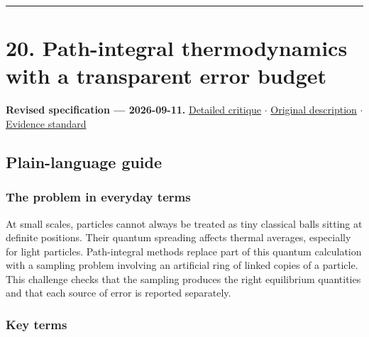 \documentclass[
  11pt,
]{article}
\begin{document}
\begin{center}\rule{0.5\linewidth}{0.5pt}\end{center}

\section{20. Path-integral thermodynamics with a transparent error
budget}

\textbf{Revised specification --- 2026-09-11.}
\href{https://github.com/rick-stevens-ai/Pure-Thought/blob/main/reviews/20-Ab-Initio-Path-Integrals.md}{Detailed
critique} \ensuremath{\cdot}
\href{https://github.com/rick-stevens-ai/Pure-Thought/blob/main/archive/original-PRDs/20-Ab-Initio-Path-Integrals.md}{Original
description} \ensuremath{\cdot}
\href{https://github.com/rick-stevens-ai/Pure-Thought/blob/main/reviews/EVIDENCE-STANDARD.md}{Evidence
standard}

\subsection{Plain-language guide}

\subsubsection{The problem in everyday terms}

At small scales, particles cannot always be treated as tiny classical
balls sitting at definite positions. Their quantum spreading affects
thermal averages, especially for light particles. Path-integral methods
replace part of this quantum calculation with a sampling problem
involving an artificial ring of linked copies of a particle. This
challenge checks that the sampling produces the right equilibrium
quantities and that each source of error is reported separately.

\subsubsection{Key terms}
\end{document}
